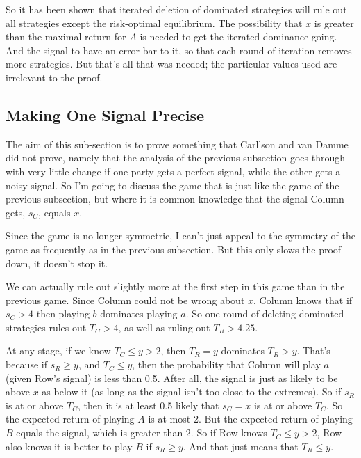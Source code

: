 \documentclass[11pt,]{book}
\begin{document}
So it has been shown that iterated deletion of dominated strategies will rule out all strategies except the risk-optimal equilibrium. The possibility that \(x\) is greater than the maximal return for \(A\) is needed to get the iterated dominance going. And the signal to have an error bar to it, so that each round of iteration removes more strategies. But that's all that was needed; the particular values used are irrelevant to the proof.

\hypertarget{perfectri}{%
\subsection{Making One Signal Precise}\label{perfectri}}

The aim of this sub-section is to prove something that Carllson and van Damme did not prove, namely that the analysis of the previous subsection goes through with very little change if one party gets a perfect signal, while the other gets a noisy signal. So I'm going to discuss the game that is just like the game of the previous subsection, but where it is common knowledge that the signal Column gets, \(s_C\), equals \(x\).

Since the game is no longer symmetric, I can't just appeal to the symmetry of the game as frequently as in the previous subsection. But this only slows the proof down, it doesn't stop it.

We can actually rule out slightly more at the first step in this game than in the previous game. Since Column could not be wrong about \(x\), Column knows that if \(s_C > 4\) then playing \(b\) dominates playing \(a\). So one round of deleting dominated strategies rules out \(T_C > 4\), as well as ruling out \(T_R > 4.25\).

At any stage, if we know \(T_C \leq y > 2\), then \(T_R = y\) dominates \(T_R > y\). That's because if \(s_R \geq y\), and \(T_C \leq y\), then the probability that Column will play \(a\) (given Row's signal) is less than 0.5. After all, the signal is just as likely to be above \(x\) as below it (as long as the signal isn't too close to the extremes). So if \(s_R\) is at or above \(T_C\), then it is at least 0.5 likely that \(s_C = x\) is at or above \(T_C\). So the expected return of playing \(A\) is at most 2. But the expected return of playing \(B\) equals the signal, which is greater than 2. So if Row knows \(T_C \leq y > 2\), Row also knows it is better to play \(B\) if \(s_R \geq y\). And that just means that \(T_R \leq y\).
\end{document}
